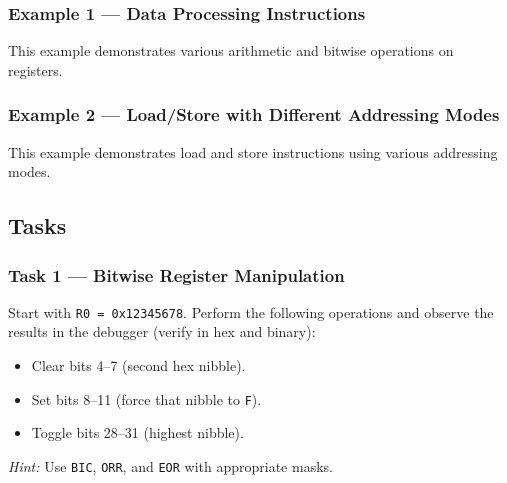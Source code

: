 \subsubsection{Example 1 --- Data Processing Instructions}
This example demonstrates various arithmetic and bitwise operations on registers.

\newpage
\subsubsection{Example 2 --- Load/Store with Different Addressing Modes}
This example demonstrates load and store instructions using various addressing modes.


\subsection{Tasks}
\subsubsection{Task 1 --- Bitwise Register Manipulation}
Start with \texttt{R0 = 0x12345678}. Perform the following operations and observe the results in the debugger (verify in hex and binary):
\begin{itemize}[nosep]
    \item Clear bits 4--7 (second hex nibble).
    \item Set bits 8--11 (force that nibble to \texttt{F}).
    \item Toggle bits 28--31 (highest nibble).
\end{itemize}
\emph{Hint:} Use \texttt{BIC}, \texttt{ORR}, and \texttt{EOR} with appropriate masks.  

